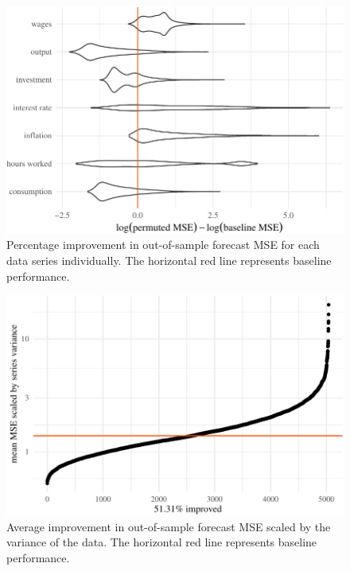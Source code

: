 \documentclass[11pt]{article}
\begin{document}
\begin{figure}[t]

{\centering \includegraphics{gfx/series-percent-improvement-1} 

}

\caption{Percentage improvement in out-of-sample forecast MSE for each data series individually. The horizontal red line represents baseline performance.}\label{fig:series-percent-improvement}
\end{figure}

\begin{figure}[t]

{\centering \includegraphics{gfx/mean-scaled-mse-1} 

}

\caption{Average improvement in out-of-sample forecast MSE scaled by the variance of the data. The horizontal red line represents baseline performance.}\label{fig:mean-scaled-mse}
\end{figure}
\end{document}
